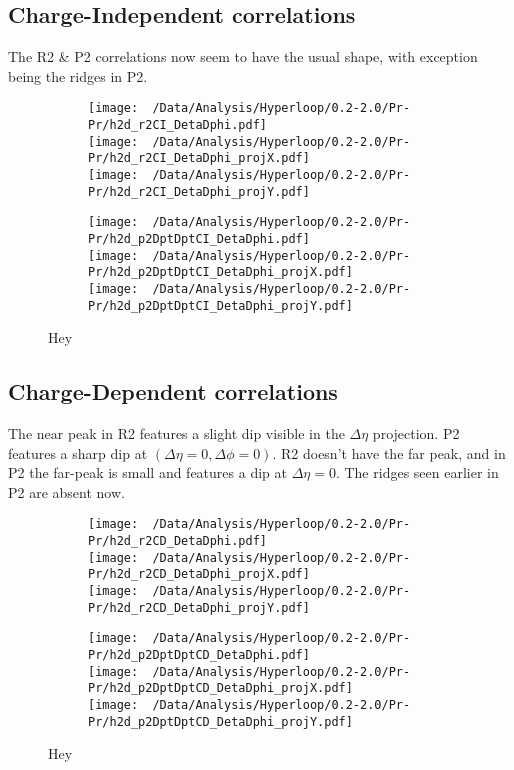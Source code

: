 \documentclass[12pt,a4paper,twoside]{report}
\begin{document}
\subsection{Charge-Independent correlations}
The R2 \& P2 correlations now seem to have the usual shape, with exception being the ridges in P2.
\begin{figure}[H]
	\begin{subfigure}{0.49\linewidth}
		\texttt{[image: ~/Data/Analysis/Hyperloop/0.2-2.0/Pr-Pr/h2d\_r2CI\_DetaDphi.pdf]}\\
		\texttt{[image: ~/Data/Analysis/Hyperloop/0.2-2.0/Pr-Pr/h2d\_r2CI\_DetaDphi\_projX.pdf]}\\
		\texttt{[image: ~/Data/Analysis/Hyperloop/0.2-2.0/Pr-Pr/h2d\_r2CI\_DetaDphi\_projY.pdf]}\\
	\end{subfigure}
	\begin{subfigure}{0.49\linewidth}
		\texttt{[image: ~/Data/Analysis/Hyperloop/0.2-2.0/Pr-Pr/h2d\_p2DptDptCI\_DetaDphi.pdf]}\\
		\texttt{[image: ~/Data/Analysis/Hyperloop/0.2-2.0/Pr-Pr/h2d\_p2DptDptCI\_DetaDphi\_projX.pdf]}\\
		\texttt{[image: ~/Data/Analysis/Hyperloop/0.2-2.0/Pr-Pr/h2d\_p2DptDptCI\_DetaDphi\_projY.pdf]}\\
	\end{subfigure}
	\caption{Hey}
\end{figure}
\subsection{Charge-Dependent correlations}
The near peak in R2 features a slight dip visible in the $\Delta\eta$ projection. P2 features a sharp dip at $(\Delta\eta=0,\Delta\phi=0)$. R2 doesn't have the far peak, and in P2 the far-peak is small and features a dip at $\Delta\eta=0$. The ridges seen earlier in P2 are absent now.
\begin{figure}[H]
	\begin{subfigure}{0.49\linewidth}
		\texttt{[image: ~/Data/Analysis/Hyperloop/0.2-2.0/Pr-Pr/h2d\_r2CD\_DetaDphi.pdf]}\\
		\texttt{[image: ~/Data/Analysis/Hyperloop/0.2-2.0/Pr-Pr/h2d\_r2CD\_DetaDphi\_projX.pdf]}\\
		\texttt{[image: ~/Data/Analysis/Hyperloop/0.2-2.0/Pr-Pr/h2d\_r2CD\_DetaDphi\_projY.pdf]}\\
	\end{subfigure}
	\begin{subfigure}{0.49\linewidth}
		\texttt{[image: ~/Data/Analysis/Hyperloop/0.2-2.0/Pr-Pr/h2d\_p2DptDptCD\_DetaDphi.pdf]}\\
		\texttt{[image: ~/Data/Analysis/Hyperloop/0.2-2.0/Pr-Pr/h2d\_p2DptDptCD\_DetaDphi\_projX.pdf]}\\
		\texttt{[image: ~/Data/Analysis/Hyperloop/0.2-2.0/Pr-Pr/h2d\_p2DptDptCD\_DetaDphi\_projY.pdf]}\\
	\end{subfigure}
	\caption{Hey}
\end{figure}
\end{document}
